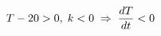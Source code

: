 \documentclass[preview]{standalone}
\begin{document}
\begin{align*}
\special{dvisvgm:raw <g id='unique000'>}T-20>0,\; k<0 \;\Rightarrow\; \frac{dT}{dt} < 0\special{dvisvgm:raw </g>}
\end{align*}
\end{document}
